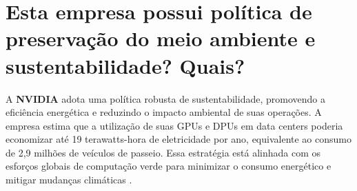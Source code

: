 \section{Esta empresa possui política de preservação do meio ambiente e sustentabilidade? Quais?}

A \textbf{NVIDIA} adota uma política robusta de sustentabilidade, promovendo a eficiência energética e reduzindo o impacto ambiental de suas operações. A empresa estima que a utilização de suas GPUs e DPUs em data centers poderia economizar até 19 terawatts-hora de eletricidade por ano, equivalente ao consumo de 2,9 milhões de veículos de passeio. Essa estratégia está alinhada com os esforços globais de computação verde para minimizar o consumo energético e mitigar mudanças climáticas \cite{nvidia_green_computing}.
